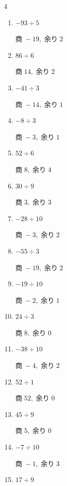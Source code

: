 \begin{multicols}{4}
\begin{enumerate}
        $商\; 3,\; 余り\; 9$

  \item $-93 \div 5$

        $商\; -19,\; 余り\; 2$

  \item $86 \div 6$

        $商\; 14,\; 余り\; 2$

  \item $-41 \div 3$

        $商\; -14,\; 余り\; 1$

  \item $-8 \div 3$

        $商\; -3,\; 余り\; 1$

  \item $52 \div 6$

        $商\; 8,\; 余り\; 4$

  \item $30 \div 9$

        $商\; 3,\; 余り\; 3$

  \item $-28 \div 10$

        $商\; -3,\; 余り\; 2$

  \item $-55 \div 3$

        $商\; -19,\; 余り\; 2$

  \item $-19 \div 10$

        $商\; -2,\; 余り\; 1$

  \item $24 \div 3$

        $商\; 8,\; 余り\; 0$

\columnbreak %

  \item $-38 \div 10$

        $商\; -4,\; 余り\; 2$

  \item $52 \div 1$

        $商\; 52,\; 余り\; 0$

  \item $45 \div 9$

        $商\; 5,\; 余り\; 0$

  \item $-7 \div 10$

        $商\; -1,\; 余り\; 3$

  \item $17 \div 9$


\end{enumerate}
\end{multicols}
